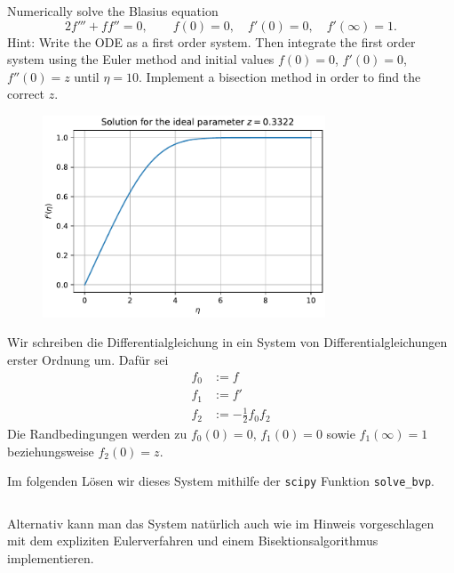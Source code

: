\documentclass[12pt]{exam}
\begin{document}
\begin{questions}
    
    \question Numerically solve the Blasius equation
    \begin{equation*}
        2 f''' + ff'' = 0, \qquad f(0) = 0, \quad f'(0) = 0, \quad f'(\infty) = 1.
    \end{equation*}
    Hint: Write the ODE as a first order system. Then integrate the first order system using the Euler method and initial values $f(0) = 0$, $f'(0) = 0$, $f''(0) = z$ until $\eta = 10$. Implement a bisection method in order to find the correct $z$.
    
    \begin{figure}[!htbp]
        \centering
        \includegraphics[width=0.75\textwidth]{plot_blasius_equation.pdf}
        \label{fig:blasius_solution}
    \end{figure}

    \begin{solution}
    Wir schreiben die Differentialgleichung in ein System von Differentialgleichungen erster Ordnung um. Dafür sei
    \begin{align*}
        f_0 &:= f \\
        f_1 &:= f' \\
        f_2 &:= -\frac{1}{2} f_0 f_2
    \end{align*}
    Die Randbedingungen werden zu $f_0(0) = 0$, $f_1(0) = 0$ sowie $f_1(\infty) = 1$ beziehungsweise $f_2(0) = z$.
    
    Im folgenden Lösen wir dieses System mithilfe der \texttt{scipy} Funktion \texttt{solve\_bvp}.
    \inputminted[breaklines, fontsize=\small, firstline=1, lastline=26]{python}{blasius_equation.py}
    
    Alternativ kann man das System natürlich auch wie im Hinweis vorgeschlagen mit dem expliziten Eulerverfahren und einem Bisektionsalgorithmus implementieren.
    \inputminted[breaklines, fontsize=\small, firstline=38, lastline=75]{python}{blasius_equation.py}
    

\end{solution}
\end{questions}
\end{document}
